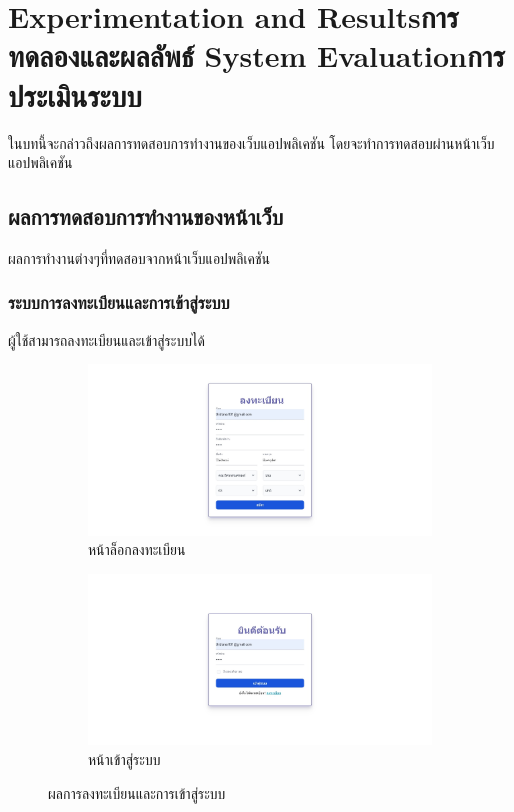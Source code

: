 \chapter{\ifproject%
\ifenglish Experimentation and Results\else การทดลองและผลลัพธ์\fi
\else%
\ifenglish System Evaluation\else การประเมินระบบ\fi
\fi}

\hspace{4ex} 
ในบทนี้จะกล่าวถึงผลการทดสอบการทำงานของเว็บแอปพลิเคชัน โดยจะทำการทดสอบผ่านหน้าเว็บแอปพลิเคชัน

\section{ผลการทดสอบการทำงานของหน้าเว็บ}
ผลการทำงานต่างๆที่ทดสอบจากหน้าเว็บแอปพลิเคชัน
\subsection{ระบบการลงทะเบียนและการเข้าสู่ระบบ}
ผู้ใช้สามารถลงทะเบียนและเข้าสู่ระบบได้
\begin{figure}[h]
  \centering
  \begin{subfigure}[b]{0.4\linewidth}
    \includegraphics[width=\linewidth]{image/web/register.jpeg}
    \caption{หน้าล็อกลงทะเบียน}
  \end{subfigure}
  \hfill
  \begin{subfigure}[b]{0.4\linewidth}
    \includegraphics[width=\linewidth]{image/web/login.jpeg}
    \caption{หน้าเข้าสู่ระบบ}
  \end{subfigure}
  \caption{ผลการลงทะเบียนและการเข้าสู่ระบบ}
  \label{fig:register-login}
\end{figure}

